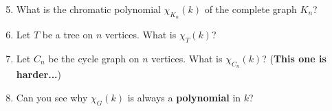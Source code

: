 \documentclass[11pt]{article}
\begin{document}
\begin{enumerate}
\setcounter{enumi}{4}
\item What is the chromatic polynomial $\chi_{K_n}(k)$ of the complete graph $K_n$?
\item Let $T$ be a tree on $n$ vertices. What is $\chi_T(k)$?
\item Let $C_n$ be the cycle graph on $n$ vertices. What is $\chi_{C_n}(k)$? ({\bf This one is harder...})
\item Can you see why $\chi_G(k)$ is always a {\bf polynomial} in $k$?
\end{enumerate}
\end{document}
